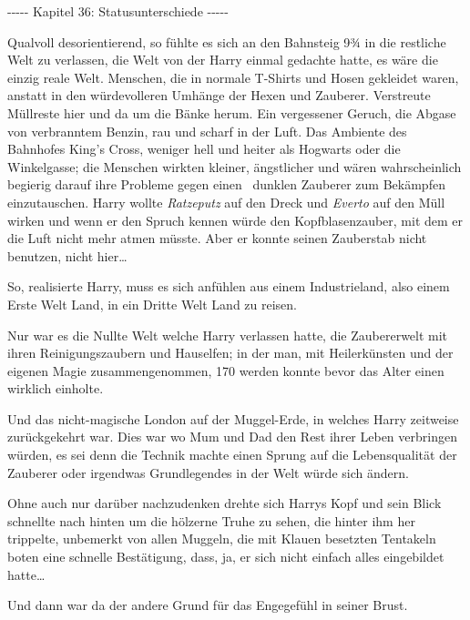 

\hypertarget{statusunterschiede}{%

-\/-\/-\/-\/- Kapitel 36: Statusunterschiede -\/-\/-\/-\/-

Qualvoll desorientierend, so fühlte es sich an den Bahnsteig 9¾ in die restliche Welt zu verlassen, die Welt von der Harry einmal gedachte hatte, es wäre die einzig reale Welt. Menschen, die in normale T-Shirts und Hosen gekleidet waren, anstatt in den würdevolleren Umhänge der Hexen und Zauberer. Verstreute Müllreste hier und da um die Bänke herum. Ein vergessener Geruch, die Abgase von verbranntem Benzin, rau und scharf in der Luft. Das Ambiente des Bahnhofes King's Cross, weniger hell und heiter als Hogwarts oder die Winkelgasse; die Menschen wirkten kleiner, ängstlicher und wären wahrscheinlich begierig darauf ihre Probleme gegen einen ~dunklen Zauberer zum Bekämpfen einzutauschen. Harry wollte \emph{Ratzeputz} auf den Dreck und \emph{Everto} auf den Müll wirken und wenn er den Spruch kennen würde den Kopfblasenzauber, mit dem er die Luft nicht mehr atmen müsste. Aber er konnte seinen Zauberstab nicht benutzen, nicht hier…

So, realisierte Harry, muss es sich anfühlen aus einem Industrieland, also einem Erste Welt Land, in ein Dritte Welt Land zu reisen.

Nur war es die Nullte Welt welche Harry verlassen hatte, die Zaubererwelt mit ihren Reinigungszaubern und Hauselfen; in der man, mit Heilerkünsten und der eigenen Magie zusammengenommen, 170 werden konnte bevor das Alter einen wirklich einholte.

Und das nicht-magische London auf der Muggel-Erde, in welches Harry zeitweise zurückgekehrt war. Dies war wo Mum und Dad den Rest ihrer Leben verbringen würden, es sei denn die Technik machte einen Sprung auf die Lebensqualität der Zauberer oder irgendwas Grundlegendes in der Welt würde sich ändern.

Ohne auch nur darüber nachzudenken drehte sich Harrys Kopf und sein Blick schnellte nach hinten um die hölzerne Truhe zu sehen, die hinter ihm her trippelte, unbemerkt von allen Muggeln, die mit Klauen besetzten Tentakeln boten eine schnelle Bestätigung, dass, ja, er sich nicht einfach alles eingebildet hatte…

Und dann war da der andere Grund für das Engegefühl in seiner Brust.

}
